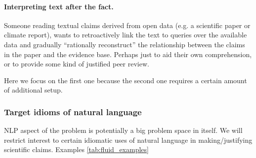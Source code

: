 \paragraph{Interpreting text after the fact.} Someone reading textual claims derived from open data (e.g. a
scientific paper or climate report), wants to retroactively link the text to queries over the available data
and gradually ``rationally reconstruct'' the relationship between the claims in the paper and the evidence
base. Perhaps just to aid their own comprehension, or to provide some kind of justified peer review.

\vspace{2mm}
\noindent Here we focus on the first one because the second one requires a certain amount of additional setup.

\subsubsection{Target idioms of natural language}

NLP aspect of the problem is potentially a big problem space in itself. We will restrict interest to certain
idiomatic uses of natural language in making/justifying scientific claims.
Examples \ref{tab:fluid_examples}

